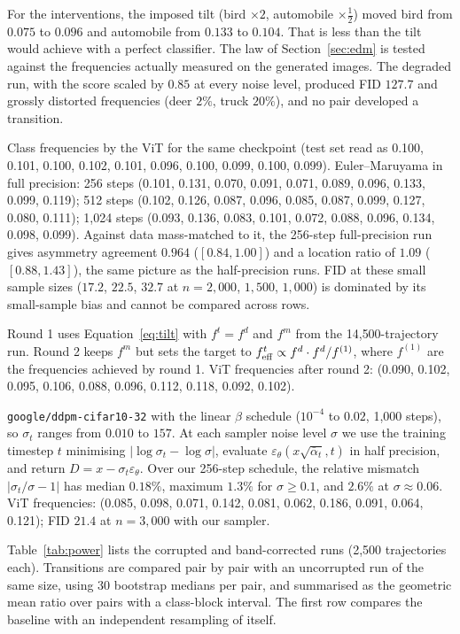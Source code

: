 For the interventions, the imposed tilt (bird $\times2$, automobile $\times\frac12$) moved bird from $0.075$ to $0.096$ and automobile from $0.133$ to $0.104$. That is less than the tilt would achieve with a perfect classifier. The law of Section~\ref{sec:edm} is tested against the frequencies actually measured on the generated images. The degraded run, with the score scaled by $0.85$ at every noise level, produced FID $127.7$ and grossly distorted frequencies (deer $2\%$, truck $20\%$), and no pair developed a transition.

Class frequencies by the ViT for the same checkpoint (test set read as 0.100, 0.101, 0.100, 0.102, 0.101, 0.096, 0.100, 0.099, 0.100, 0.099). Euler--Maruyama in full precision: 256 steps (0.101, 0.131, 0.070, 0.091, 0.071, 0.089, 0.096, 0.133, 0.099, 0.119); 512 steps (0.102, 0.126, 0.087, 0.096, 0.085, 0.087, 0.099, 0.127, 0.080, 0.111); 1{,}024 steps (0.093, 0.136, 0.083, 0.101, 0.072, 0.088, 0.096, 0.134, 0.098, 0.099). Against data mass-matched to it, the 256-step full-precision run gives asymmetry agreement $0.964$ ($[0.84,1.00]$) and a location ratio of $1.09$ ($[0.88,1.43]$), the same picture as the half-precision runs. FID at these small sample sizes ($17.2$, $22.5$, $32.7$ at $n=2{,}000$, $1{,}500$, $1{,}000$) is dominated by its small-sample bias and cannot be compared across rows.

Round 1 uses Equation~\eqref{eq:tilt} with $f^t=f^d$ and $f^m$ from the 14{,}500-trajectory run. Round 2 keeps $f^m$ but sets the target to $f^t_{\rm eff}\propto f^{d}\cdot f^{d}/f^{(1)}$, where $f^{(1)}$ are the frequencies achieved by round 1. ViT frequencies after round 2: (0.090, 0.102, 0.095, 0.106, 0.088, 0.096, 0.112, 0.118, 0.092, 0.102).

\texttt{google/ddpm-cifar10-32} with the linear $\beta$ schedule ($10^{-4}$ to $0.02$, 1{,}000 steps), so $\sigma_t$ ranges from $0.010$ to $157$. At each sampler noise level $\sigma$ we use the training timestep $t$ minimising $|\log\sigma_t-\log\sigma|$, evaluate $\varepsilon_\theta(x\sqrt{\bar\alpha_t},t)$ in half precision, and return $D=x-\sigma_t\varepsilon_\theta$. Over our 256-step schedule, the relative mismatch $|\sigma_t/\sigma-1|$ has median $0.18\%$, maximum $1.3\%$ for $\sigma\ge0.1$, and $2.6\%$ at $\sigma\approx0.06$. ViT frequencies: (0.085, 0.098, 0.071, 0.142, 0.081, 0.062, 0.186, 0.091, 0.064, 0.121); FID $21.4$ at $n=3{,}000$ with our sampler.

Table~\ref{tab:power} lists the corrupted and band-corrected runs (2{,}500 trajectories each). Transitions are compared pair by pair with an uncorrupted run of the same size, using 30 bootstrap medians per pair, and summarised as the geometric mean ratio over pairs with a class-block interval. The first row compares the baseline with an independent resampling of itself.

